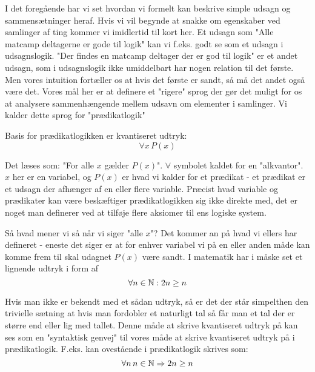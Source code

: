 I det foregående har vi set hvordan vi formelt kan beskrive simple udsagn og sammensætninger heraf. Hvis vi vil begynde at snakke om egenskaber ved samlinger af ting kommer vi imidlertid til kort her. Et udsagn som "Alle matcamp deltagerne er gode til logik" kan vi f.eks. godt se som et udsagn i udsagnslogik. "Der findes en matcamp deltager der er god til logik" er et andet udsagn, som i udsagnslogik ikke umiddelbart har nogen relation til det første. Men vores intuition fortæller os at hvis det første er sandt, så må det andet også være det. Vores mål her er at definere et "rigere" sprog der gør det muligt for os at analysere sammenhængende mellem udsavn om elementer i samlinger. Vi kalder dette sprog for "prædikatlogik"

Basis for prædikatlogikken er kvantiseret udtryk:
\[
	\forall x \, P(x)
\]

Det læses som: "For alle $x$ gælder $P(x)$". $\forall$ symbolet kaldet for en "alkvantor". $x$ her er en variabel, og $P(x)$ er hvad vi kalder for et prædikat - et prædikat er et udsagn der afhænger af en eller flere variable. Præcist hvad variable og prædikater kan være beskæftiger prædikatlogikken sig ikke direkte med, det er noget man definerer ved at tilføje flere aksiomer til ens logiske system.

Så hvad mener vi så når vi siger "alle $x$"? Det kommer an på hvad vi ellers har defineret - eneste det siger er at for enhver variabel vi på en eller anden måde kan komme frem til skal udagnet $P(x)$ være sandt. I matematik har i måske set et lignende udtryk i form af
\[
	\forall n \in \mathbb{N} : 2n \geq n
\]

Hvis man ikke er bekendt med et sådan udtryk, så er det der står simpelthen den trivielle sætning at hvis man fordobler et naturligt tal så får man et tal der er større end eller lig med tallet. Denne måde at skrive kvantiseret udtryk på kan ses som en "syntaktisk genvej" til vores måde at skrive kvantiseret udtryk på i prædikatlogik. F.eks. kan ovestående i prædikatlogik skrives som: 
\[
	\forall n \, n \in \mathbb{N} \Rightarrow 2n \geq n
\]

